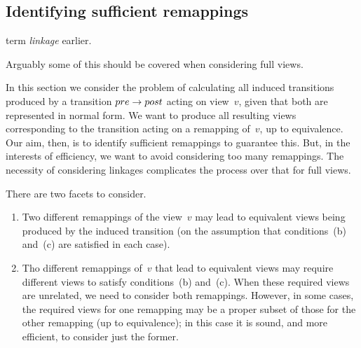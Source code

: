 \subsection{Identifying sufficient remappings}

 term \emph{linkage} earlier.

  Arguably some of this
should be covered when considering full views. 

In this section we consider the problem of calculating all induced transitions
produced by a transition $pre \stackrel{}\rightarrow post$ acting on view~$v$, given that
both are represented in normal form.  We want to produce all resulting views
corresponding to the transition acting on a remapping of~$v$, up to
equivalence.  Our aim, then, is to identify sufficient remappings to guarantee
this.  But, in the interests of efficiency, we want to avoid considering too
many remappings.  The necessity of considering linkages complicates the
process over that for full views.


There are two facets to consider.
%
\begin{enumerate}
\item Two different remappings of the view~$v$ may lead to equivalent views
  being produced by the induced transition (on the assumption that
  conditions~(b) and~(c) are satisfied in each case).

\item Tho different remappings of~$v$ that lead to equivalent views may
  require different views to satisfy conditions~(b) and~(c).  When these
  required views are unrelated, we need to consider both remappings.  However,
  in some cases, the required views for one remapping may be a proper subset
  of those for the other remapping (up to equivalence); in this case it is
  sound, and more efficient, to consider just the former.  
\end{enumerate}

